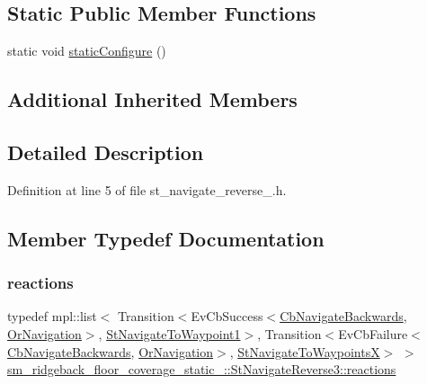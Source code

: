 \subsection*{Static Public Member Functions}
\begin{DoxyCompactItemize}
\item 
static void \hyperlink{structsm__ridgeback__floor__coverage__static__1_1_1StNavigateReverse3_a9eb3b774beb0ba424fdd05a50b5c005a}{static\+Configure} ()
\end{DoxyCompactItemize}
\subsection*{Additional Inherited Members}


\subsection{Detailed Description}


Definition at line 5 of file st\+\_\+navigate\+\_\+reverse\+\_.\+h.



\subsection{Member Typedef Documentation}
\mbox{\label{structsm__ridgeback__floor__coverage__static__1_1_1StNavigateReverse3_a9d1dd27b2769894b2aa7bff447b99b0a}} 
\subsubsection{\texorpdfstring{reactions}{reactions}}
{\footnotesize\ttfamily typedef mpl\+::list$<$ Transition$<$Ev\+Cb\+Success$<$\hyperlink{classcl__move__base__z_1_1CbNavigateBackwards}{Cb\+Navigate\+Backwards}, \hyperlink{classsm__ridgeback__floor__coverage__static__1_1_1OrNavigation}{Or\+Navigation}$>$, \hyperlink{structsm__ridgeback__floor__coverage__static__1_1_1StNavigateToWaypoint1}{St\+Navigate\+To\+Waypoint1}$>$, Transition$<$Ev\+Cb\+Failure$<$\hyperlink{classcl__move__base__z_1_1CbNavigateBackwards}{Cb\+Navigate\+Backwards}, \hyperlink{classsm__ridgeback__floor__coverage__static__1_1_1OrNavigation}{Or\+Navigation}$>$, \hyperlink{structsm__ridgeback__floor__coverage__static__1_1_1StNavigateToWaypointsX}{St\+Navigate\+To\+WaypointsX}$>$ $>$ \hyperlink{structsm__ridgeback__floor__coverage__static__1_1_1StNavigateReverse3_a9d1dd27b2769894b2aa7bff447b99b0a}{sm\+\_\+ridgeback\+\_\+floor\+\_\+coverage\+\_\+static\+\_\+::\+St\+Navigate\+Reverse3\+::reactions}}



